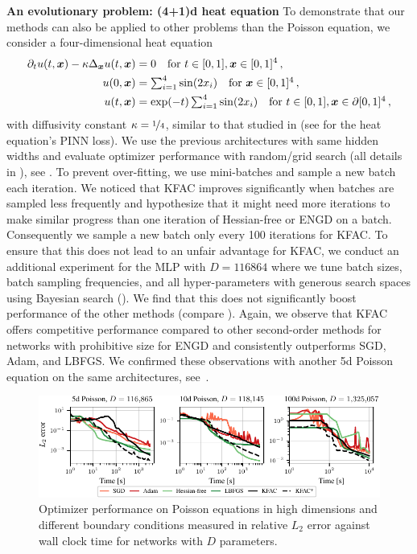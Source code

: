 \textbf{An evolutionary problem: (4+1)d heat equation}
To demonstrate that our methods can also be applied to other problems than the Poisson equation, we consider a four-dimensional heat equation
\begin{align}\label{eq:4D-heat}
  \begin{split}
    \partial_t u(t,{\bm{x}})-\kappa\Delta_{\bm{x}} u(t,{\bm{x}})
    &=
      0 \quad \text{for } t\in[0,1], {\bm{x}}\in [0,1]^{4}\,,
    \\
    u(0,{\bm{x}})
    &=
      \textstyle
      \sum_{i=1}^{4} \sin(2 x_i) \quad \text{for }
      {\bm{x}}\in [0,1]^{4}\,,
    \\
    u(t,{\bm{x}})
    &=
      \textstyle
      \exp(-t) \sum_{i=1}^{4} \sin(2 x_i) \quad \text{for } t\in[0,1], {\bm{x}}\in\partial[0,1]^{4}\,,
  \end{split}
\end{align}
with diffusivity constant $\kappa = \nicefrac{1}{4}$, similar to that studied in \cite{muller2023achieving} (see  for the heat equation's PINN loss).
We use the previous architectures with same hidden widths and evaluate optimizer performance with random/grid search (all details in ), see .
To prevent over-fitting, we use mini-batches and sample a new batch each iteration.
We noticed that KFAC improves significantly when batches are sampled less frequently and hypothesize that it might need more iterations to make similar progress than one iteration of Hessian-free or ENGD on a batch.
Consequently we sample a new batch only every 100 iterations for KFAC.
To ensure that this does not lead to an unfair advantage for KFAC, we conduct an additional experiment for the MLP with $D=\num{116864}$ where we tune batch sizes, batch sampling frequencies, and all hyper-parameters with generous search spaces using Bayesian search ().
We find that this does not significantly boost performance of the other methods (compare ).
Again, we observe that KFAC offers competitive performance compared to other second-order methods for networks with prohibitive size for ENGD and consistently outperforms SGD, Adam, and LBFGS.
We confirmed these observations with another 5d Poisson equation on the same architectures, see~.

\begin{figure}
  \centering
  \includegraphics{kfac_pinns_exp/exp33_poisson_bayes_groupplot/l2_error_over_time.pdf}
  \caption{
    Optimizer performance on Poisson equations in high dimensions and different boundary conditions measured in relative $L_2$ error against wall clock time for networks with $D$ parameters.
  }
  \label{fig:10D-Poisson}
\end{figure}

